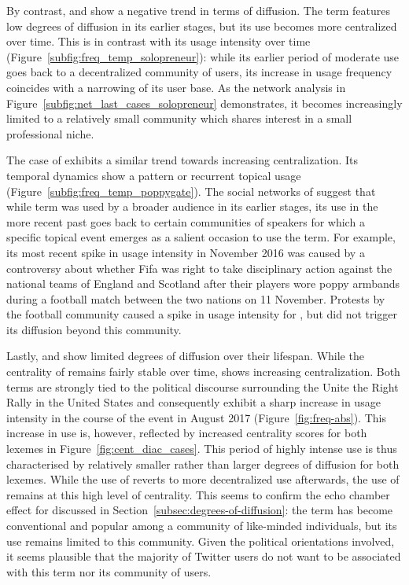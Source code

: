 \documentclass[
  a4paper,
  abstract=on,
  captions=tableabove
  ]{scrartcl}
\begin{document}
      By contrast,  and  show a negative trend in terms of diffusion. The term  features low degrees of diffusion in its earlier stages, but its use becomes more centralized over time. This is in contrast with its usage intensity over time (Figure~\ref{subfig:freq_temp_solopreneur}): while its earlier period of moderate use goes back to a decentralized community of users, its increase in usage frequency coincides with a narrowing of its user base. As the network analysis in Figure~\ref{subfig:net_last_cases_solopreneur} demonstrates, it becomes increasingly limited to a relatively small community which shares interest in a small professional niche.   

      The case of  exhibits a similar trend towards increasing centralization. Its temporal dynamics show a pattern or recurrent topical usage (Figure~\ref{subfig:freq_temp_poppygate}). The social networks of  suggest that while term was used by a broader audience in its earlier stages, its use in the more recent past goes back to certain communities of speakers for which a specific topical event emerges as a salient occasion to use the term. For example, its most recent spike in usage intensity in November 2016 was caused by a controversy about whether Fifa was right to take disciplinary action against the national teams of England and Scotland after their players wore poppy armbands during a football match between the two nations on 11 November. Protests by the football community caused a spike in usage intensity for , but did not trigger its diffusion beyond this community.

      Lastly,  and  show limited degrees of diffusion over their lifespan. While the centrality of  remains fairly stable over time,  shows increasing centralization. Both terms are strongly tied to the political discourse surrounding the Unite the Right Rally in the United States and consequently exhibit a sharp increase in usage intensity in the course of the event in August 2017 (Figure~\ref{fig:freq-abs}). This increase in use is, however, reflected by increased centrality scores for both lexemes in Figure~\ref{fig:cent_diac_cases}. This period of highly intense use is thus characterised by relatively smaller rather than larger degrees of diffusion for both lexemes. While the use of  reverts to more decentralized use afterwards, the use of  remains at this high level of centrality. This seems to confirm the echo chamber effect for  discussed in Section~\ref{subsec:degrees-of-diffusion}: the term has become conventional and popular among a community of like-minded individuals, but its use remains limited to this community. Given the political orientations involved, it seems plausible that the majority of Twitter users do not want to be associated with this term nor its community of users.  
\end{document}
